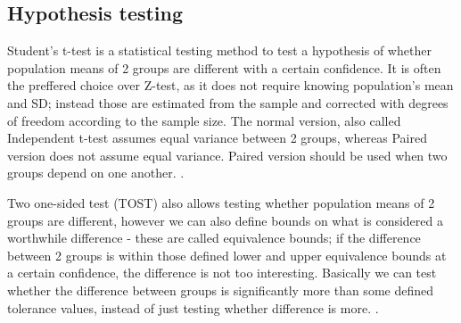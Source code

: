 \subsection{Hypothesis testing}
Student's t-test is a statistical testing method to test a hypothesis of whether population means of 2 groups are different with a certain confidence. It is often the preffered choice over Z-test, as it does not require knowing population's mean and SD; instead those are estimated from the sample and corrected with degrees of freedom according to the sample size. The normal version, also called Independent t-test assumes equal variance between 2 groups, whereas Paired version does not assume equal variance. Paired version should be used when two groups depend on one another. \cite{LIVINGSTON200458}. 

Two one-sided test (TOST) also allows testing whether population means of 2 groups are different, however we can also define bounds on what is considered a worthwhile difference - these are called equivalence bounds; if the difference between 2 groups is within those defined lower and upper equivalence bounds at a certain confidence, the difference is not too interesting. Basically we can test whether the difference between groups is significantly more than some defined tolerance values, instead of just testing whether difference is more. \cite{tost}.
